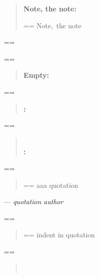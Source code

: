 \documentclass{book}
\makeatletter
\newenvironment{Texinfopreformatted}{%
  \par\GNUTobeylines\obeyspaces\frenchspacing\parskip=\z@\parindent=\z@}{}
{\catcode`\^^M=13 \gdef\GNUTobeylines{\catcode`\^^M=13 \def^^M{\null\par}}}
\newenvironment{Texinfoindented}{\begin{list}{}{}\item\relax}{\end{list}}
\renewcommand{\_}{\Texinfounderscore\discretionary{}{}{}}
\makeatother
\begin{document}
\begin{Texinfoindented}
\begin{quote}
\textbf{Note, the note:} \begin{Texinfopreformatted}%
\ttfamily Note,\ the note
\end{Texinfopreformatted}
\end{quote}
\begin{Texinfopreformatted}%
\ttfamily 
\end{Texinfopreformatted}
\begin{quote}
\end{quote}
\begin{Texinfopreformatted}%
\ttfamily 
\end{Texinfopreformatted}
\begin{quote}
\textbf{Empty:} \end{quote}
\begin{Texinfopreformatted}%
\ttfamily 
\end{Texinfopreformatted}
\begin{quote}
\textbf{:} \end{quote}
\begin{Texinfopreformatted}%
\ttfamily 
\end{Texinfopreformatted}
\begin{quote}
\textbf{\leavevmode{}\\:} \end{quote}
\begin{Texinfopreformatted}%
\ttfamily 
\end{Texinfopreformatted}
\begin{quote}
\begin{Texinfopreformatted}%
\ttfamily aaa quotation
\end{Texinfopreformatted}
\end{quote}
\begin{center}
--- \emph{quotation author}
\end{center}
\begin{Texinfopreformatted}%
\ttfamily 
\end{Texinfopreformatted}
\begin{quote}
\begin{Texinfopreformatted}%
\ttfamily indent in quotation
\end{Texinfopreformatted}
\end{quote}
\begin{Texinfopreformatted}%
\ttfamily 
\end{Texinfopreformatted}
\begin{quote}
\leavevmode{}\\

\end{quote}
\end{Texinfoindented}
\end{document}
